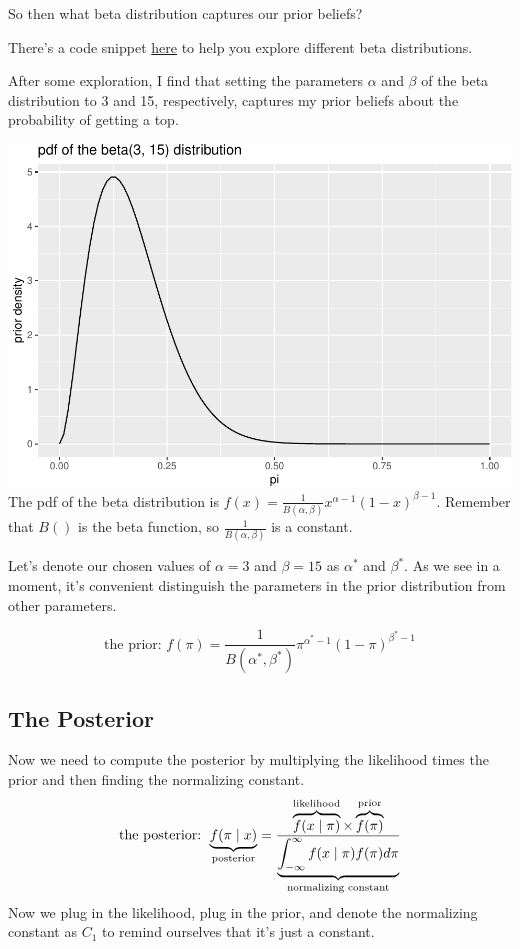 \documentclass[
]{book}
\begin{document}
So then what beta distribution captures our prior beliefs?

There's a code snippet \href{https://gist.github.com/carlislerainey/45414e0d9f22e4e1960449402e6a8048}{here} to help you explore different beta distributions.

After some exploration, I find that setting the parameters \(\alpha\) and \(\beta\) of the beta distribution to 3 and 15, respectively, captures my prior beliefs about the probability of getting a top.

\includegraphics{02-01-bayes_files/figure-latex/unnamed-chunk-3-1.pdf}
The pdf of the beta distribution is \(f(x) = \frac{1}{B(\alpha, \beta)} x^{\alpha - 1}(1 - x)^{\beta - 1}\). Remember that \(B()\) is the beta function, so \(\frac{1}{B(\alpha, \beta)}\) is a constant.

Let's denote our chosen values of \(\alpha = 3\) and \(\beta = 15\) as \(\alpha^*\) and \(\beta^*\). As we see in a moment, it's convenient distinguish the parameters in the prior distribution from other parameters.

\[
\text{the prior:  }  f(\pi) = \frac{1}{B(\alpha^*, \beta^*)} \pi^{\alpha^* - 1}(1 - \pi)^{\beta^* - 1}
\]

\hypertarget{the-posterior}{%
\subsection{The Posterior}\label{the-posterior}}

Now we need to compute the posterior by multiplying the likelihood times the prior and then finding the normalizing constant.
\[
\text{the posterior: } \displaystyle \underbrace{f(\pi \mid x)}_{\text{posterior}} = \frac{\overbrace{f(x \mid \pi)}^{\text{likelihood}} \times \overbrace{f(\pi)}^{\text{prior}}}{\displaystyle \underbrace{\int_{-\infty}^\infty f(x \mid \pi)f(\pi) d\pi}_{\text{normalizing constant}}} \\
\]
Now we plug in the likelihood, plug in the prior, and denote the normalizing constant as \(C_1\) to remind ourselves that it's just a constant.
\end{document}
